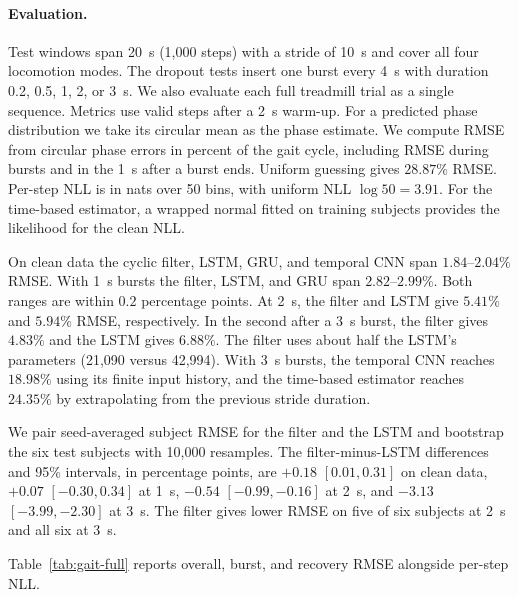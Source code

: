 \paragraph{Evaluation.}
Test windows span 20~s (1,000 steps) with a stride of 10~s and cover all four
locomotion modes. The dropout tests insert one burst every 4~s with duration
0.2, 0.5, 1, 2, or 3~s. We also evaluate each full treadmill trial as a single
sequence. Metrics use valid steps after a 2~s warm-up. For a predicted phase
distribution we take its circular mean as the phase estimate. We compute RMSE
from circular phase errors in percent of the gait cycle, including RMSE during
bursts and in the 1~s after a burst ends. Uniform guessing gives $28.87\%$
RMSE. Per-step NLL is in nats over 50 bins, with uniform NLL $\log 50=3.91$.
For the time-based estimator, a wrapped normal fitted on training subjects
provides the likelihood for the clean NLL.

On clean data the cyclic filter, LSTM, GRU, and temporal CNN span
$1.84$--$2.04\%$ RMSE. With 1~s bursts the filter, LSTM, and GRU span
$2.82$--$2.99\%$. Both ranges are within $0.2$ percentage points. At
2~s, the filter and LSTM give $5.41\%$ and $5.94\%$ RMSE, respectively.
In the second after a 3~s burst, the filter gives $4.83\%$ and the LSTM
gives $6.88\%$. The filter uses about half the LSTM's parameters
(21,090 versus 42,994). With 3~s bursts, the temporal CNN reaches $18.98\%$
using its finite input history, and the time-based estimator reaches
$24.35\%$ by extrapolating from the previous stride duration.

We pair seed-averaged subject RMSE for the
filter and the LSTM and bootstrap the six test subjects with 10,000 resamples.
The filter-minus-LSTM differences and 95\% intervals, in percentage points,
are $+0.18$ $[0.01,0.31]$ on clean data, $+0.07$ $[-0.30,0.34]$ at 1~s,
$-0.54$ $[-0.99,-0.16]$ at 2~s, and $-3.13$ $[-3.99,-2.30]$ at 3~s.
The filter gives lower RMSE on five of six subjects at 2~s and all six at 3~s.

Table~\ref{tab:gait-full} reports overall, burst, and recovery RMSE
alongside per-step NLL.

